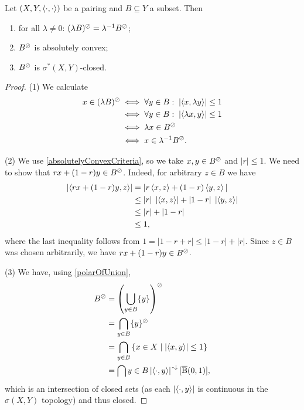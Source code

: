 \begin{lemma} \label{polarPropertiesLemma}
Let $\left( X,Y,\left\langle \cdot,\cdot \right\rangle \right)$ be a pairing and $B\subseteq Y$ a subset. Then
\begin{enumerate}
\item for all $\lambda \neq 0$: $(\lambda B)^{\oslash} = \lambda^{-1}B^{\oslash}$;
\item $B^{\oslash}$ is absolutely convex;
\item $B^{\oslash}$ is $\sigma^*(X,Y)$-closed.
\end{enumerate}
\end{lemma}
\begin{proof}
(1) We calculate
\begin{align*}
x\in (\lambda B)^{\oslash} &\iff \forall y\in B:\; \left|\left\langle x,\lambda y \right\rangle\right| \leq 1 \\
&\iff \forall y\in B:\; \left|\left\langle \lambda x,y \right\rangle\right| \leq 1 \\
&\iff \lambda x\in B^\oslash \\
&\iff x\in \lambda^{-1}B^\oslash.
\end{align*}

(2) We use \ref{absolutelyConvexCriteria}, so we take $x,y\in B^\oslash$ and $|r|\leq 1$. We need to show that $rx + (1-r)y\in B^\oslash$. Indeed, for arbitrary $z\in B$ we have
\begin{align*}
\left|\left\langle rx + (1-r)y, z \right\rangle\right| &= |r\left\langle x,z \right\rangle + (1-r)\left\langle y,z \right\rangle| \\
&\leq |r|\;\left|\left\langle x,z \right\rangle\right| + |1-r|\;\left|\left\langle y,z \right\rangle\right| \\
&\leq |r| + |1-r| \\
&\leq 1,
\end{align*}
where the last inequality follows from $1 = |1 - r + r| \leq |1-r| + |r|$. Since $z\in B$ was chosen arbitrarily, we have $rx + (1-r)y\in B^\oslash$.

(3) We have, using \ref{polarOfUnion},
\begin{align*}
B^\oslash &= \left(\bigcup_{y\in B}\{y\}\right)^\oslash \\
&= \bigcap_{y\in B} \{y\}^\oslash \\
&= \bigcap_{y\in B}\left\{ x\in X \;\middle|\; \left|\left\langle x,y \right\rangle\right|\leq 1 \right\} \\
&= \bigcap{y\in B}\left|\left\langle \cdot, y \right\rangle\right|^{{\text{\hspace{0.15em}-}\downarrow}}[\operatorname{\overline{B}}(0,1)],
\end{align*}
which is an intersection of closed sets (as each $\left|\left\langle \cdot, y \right\rangle\right|$ is continuous in the $\sigma(X,Y)$ topology) and thus closed.
\end{proof}

